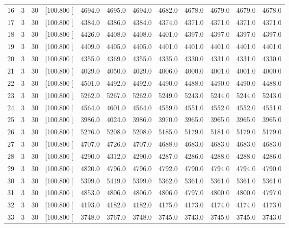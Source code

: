 \documentclass[12pt,a4paper]{article}
\begin{document}
\begin{center}
{\begin{tabular}{r r r r r r r r r r r r}
  16&  3& 30&[100.800   ]&  4694.0&  4695.0&  4694.0&  4682.0&  4678.0&  4679.0&  4679.0&  4678.0\\[-0.02in]
  17&  3& 30&[100.800   ]&  4384.0&  4386.0&  4384.0&  4374.0&  4371.0&  4371.0&  4371.0&  4371.0\\[-0.02in]
  18&  3& 30&[100.800   ]&  4426.0&  4408.0&  4408.0&  4401.0&  4397.0&  4397.0&  4397.0&  4397.0\\[-0.02in]
  19&  3& 30&[100.800   ]&  4409.0&  4405.0&  4405.0&  4401.0&  4401.0&  4401.0&  4401.0&  4401.0\\[-0.02in]
  20&  3& 30&[100.800   ]&  4355.0&  4369.0&  4355.0&  4335.0&  4330.0&  4331.0&  4331.0&  4330.0\\[-0.02in]
  21&  3& 30&[100.800   ]&  4029.0&  4050.0&  4029.0&  4006.0&  4000.0&  4001.0&  4001.0&  4000.0\\[-0.02in]
  22&  3& 30&[100.800   ]&  4501.0&  4492.0&  4492.0&  4490.0&  4488.0&  4490.0&  4490.0&  4488.0\\[-0.02in]
  23&  3& 30&[100.800   ]&  5262.0&  5267.0&  5262.0&  5249.0&  5243.0&  5244.0&  5244.0&  5243.0\\[-0.02in]
  24&  3& 30&[100.800   ]&  4564.0&  4601.0&  4564.0&  4559.0&  4551.0&  4552.0&  4552.0&  4551.0\\[-0.02in]
  25&  3& 30&[100.800   ]&  3986.0&  4024.0&  3986.0&  3970.0&  3965.0&  3965.0&  3965.0&  3965.0\\[-0.02in]
  26&  3& 30&[100.800   ]&  5276.0&  5208.0&  5208.0&  5185.0&  5179.0&  5181.0&  5179.0&  5179.0\\[-0.02in]
  27&  3& 30&[100.800   ]&  4707.0&  4726.0&  4707.0&  4688.0&  4683.0&  4683.0&  4683.0&  4683.0\\[-0.02in]
  28&  3& 30&[100.800   ]&  4290.0&  4312.0&  4290.0&  4287.0&  4286.0&  4288.0&  4288.0&  4286.0\\[-0.02in]
  29&  3& 30&[100.800   ]&  4820.0&  4796.0&  4796.0&  4792.0&  4790.0&  4794.0&  4794.0&  4790.0\\[-0.02in]
  30&  3& 30&[100.800   ]&  5399.0&  5419.0&  5399.0&  5362.0&  5361.0&  5361.0&  5361.0&  5361.0\\[-0.02in]
  31&  3& 30&[100.800   ]&  4853.0&  4806.0&  4806.0&  4806.0&  4797.0&  4800.0&  4800.0&  4797.0\\[-0.02in]
  32&  3& 30&[100.800   ]&  4193.0&  4182.0&  4182.0&  4175.0&  4173.0&  4174.0&  4174.0&  4173.0\\[-0.02in]
  33&  3& 30&[100.800   ]&  3748.0&  3767.0&  3748.0&  3745.0&  3743.0&  3745.0&  3745.0&  3743.0\\[-0.02in]

\end{tabular}}
\end{center}
\end{document}

